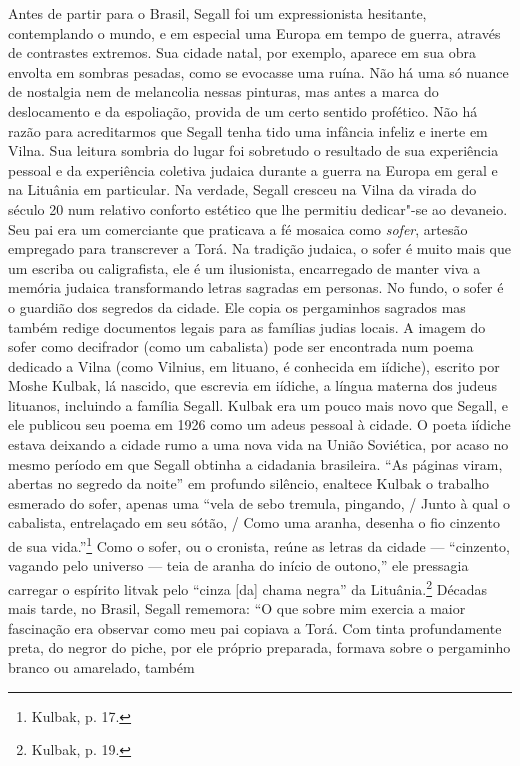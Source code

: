 Antes de partir para o Brasil, Segall foi um expressionista hesitante,
contemplando o mundo, e em especial uma Europa em tempo de guerra,
através de contrastes extremos. Sua cidade natal, por exemplo, aparece
em sua obra envolta em sombras pesadas, como se evocasse uma ruína. Não
há uma só nuance de nostalgia nem de melancolia nessas pinturas, mas
antes a marca do deslocamento e da espoliação, provida de um certo
sentido profético. Não há razão para acreditarmos que Segall tenha tido
uma infância infeliz e inerte em Vilna. Sua leitura sombria do lugar foi
sobretudo o resultado de sua experiência pessoal e da experiência
coletiva judaica durante a guerra na Europa em geral e na Lituânia em
particular. Na verdade, Segall cresceu na Vilna da virada do século 20
num relativo conforto estético que lhe permitiu dedicar"-se ao devaneio.
Seu pai era um comerciante que praticava a fé mosaica como \emph{sofer},
artesão empregado para transcrever a Torá. Na tradição judaica, o sofer
é muito mais que um escriba ou caligrafista, ele é um ilusionista,
encarregado de manter viva a memória judaica transformando letras
sagradas em personas. No fundo, o sofer é o guardião dos segredos da
cidade. Ele copia os pergaminhos sagrados mas também redige documentos
legais para as famílias judias locais. A imagem do sofer como decifrador
(como um cabalista) pode ser encontrada num poema dedicado a Vilna (como
Vilnius, em lituano, é conhecida em iídiche), escrito por Moshe Kulbak,
lá nascido, que escrevia em iídiche, a língua materna dos judeus
lituanos, incluindo a família Segall. Kulbak era um pouco mais novo que
Segall, e ele publicou seu poema em 1926 como um adeus pessoal à cidade.
O poeta iídiche estava deixando a cidade rumo a uma nova vida na União
Soviética, por acaso no mesmo período em que Segall obtinha a cidadania
brasileira. ``As páginas viram, abertas no segredo da noite'' em
profundo silêncio, enaltece Kulbak o trabalho esmerado do sofer, apenas
uma ``vela de sebo tremula, pingando, / Junto à qual o cabalista,
entrelaçado em seu sótão, / Como uma aranha, desenha o fio cinzento de
sua vida.''\footnote{Kulbak, p. 17.} Como o sofer, ou o cronista, reúne
as letras da cidade --- ``cinzento, vagando pelo universo --- teia de aranha
do início de outono,'' ele pressagia carregar o espírito litvak pelo
``cinza {[}da{]} chama negra'' da Lituânia.\footnote{Kulbak, p. 19.}
Décadas mais tarde, no Brasil, Segall rememora: ``O que sobre mim
exercia a maior fascinação era observar como meu pai copiava a Torá. Com
tinta profundamente preta, do negror do piche, por ele próprio
preparada, formava sobre o pergaminho branco ou amarelado, também
